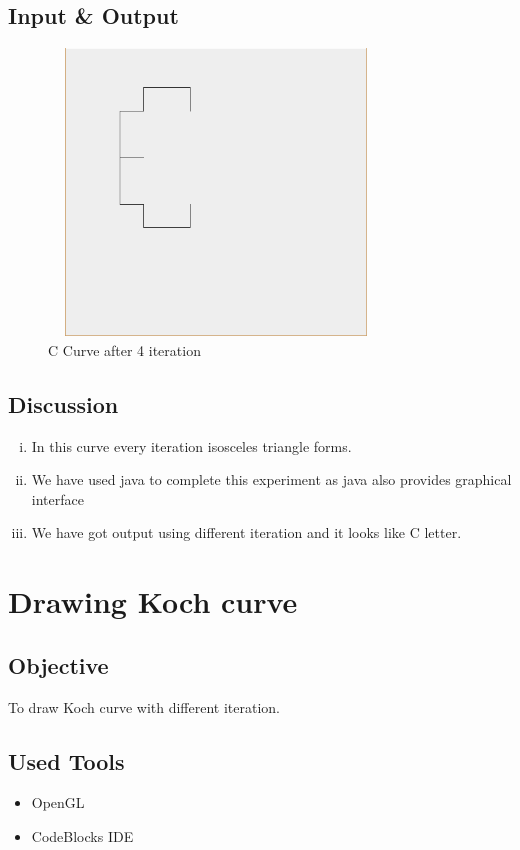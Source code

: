 \documentclass[11pt]{report}
\begin{document}
\section{Input \& Output}
\begin{figure}[ht!]
	\centering
	\includegraphics[height=3.0in,width=3.5in]{c_curve_4}
	\caption{C Curve after 4 iteration}
\end{figure}


\section{Discussion}
\begin{enumerate}[(i)]
	\item In this curve every iteration isosceles triangle forms. 
	\item We have used java to complete this experiment as java also provides graphical interface 
	\item We have got output using different iteration and it looks like C letter. 
\end{enumerate}




\chapter{Drawing Koch curve}
\section{Objective}
To draw Koch curve with different iteration.
\section{Used Tools}
\begin{itemize}
	\item OpenGL
	\item CodeBlocks IDE
\end{itemize}
\end{document}
